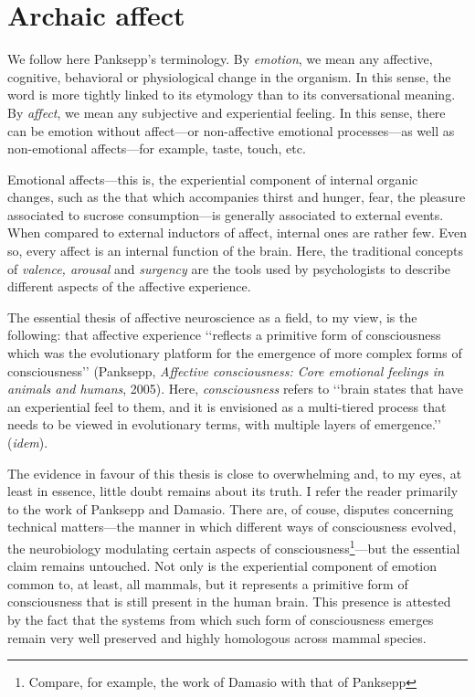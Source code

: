 \documentclass[a4paper]{article}
\begin{document}
    \section{Archaic affect}

    We follow here Panksepp's terminology. By \textit{emotion}, we mean any
    affective, cognitive, behavioral or physiological change in the organism. In
    this sense, the word is more tightly linked to its etymology than to its
    conversational meaning. By \textit{affect}, we mean any subjective and
    experiential feeling. In this sense, there can be emotion without
    affect---or non-affective emotional processes---as well as non-emotional
    affects---for example, taste, touch, etc.

    Emotional affects---this is, the experiential component of internal organic
    changes, such as the that which accompanies thirst and hunger, fear, the
    pleasure associated to sucrose consumption---is generally associated to
    external events. When compared to external inductors of affect, internal
    ones are rather few. Even so, every affect is an internal function of the
    brain. Here, the traditional concepts of \textit{valence, arousal} and
    \textit{surgency} are the tools used by psychologists to describe different
    aspects of the affective experience.

    The essential thesis of affective neuroscience as a field, to my view, is
    the following: that affective experience \lq\lq reflects a primitive form of
    consciousness which was the evolutionary platform for the emergence of more
    complex forms of consciousness\rq\rq{} (Panksepp, \textit{Affective consciousness:
    Core emotional feelings in animals and humans}, 2005). Here,
    \textit{consciousness} refers to \lq\lq brain states that have an
    experiential feel to them, and it is envisioned as a multi-tiered process
    that needs to be viewed in evolutionary terms, with multiple layers of
    emergence.\rq\rq{} (\textit{idem}).

    The evidence in favour of this thesis is close to overwhelming and, to my
    eyes, at least in essence, little doubt remains about its truth. I refer the
    reader primarily to the work of Panksepp and Damasio. There are, of couse,
    disputes concerning technical matters---the manner in which different ways
    of consciousness evolved, the neurobiology modulating certain aspects of
    consciousness\footnote{Compare, for example, the work of Damasio with that
    of Panksepp}---but the essential claim remains untouched. Not only is the
    experiential component of emotion common to, at least, all mammals, but it
    represents a primitive form of consciousness that is still present in the
    human brain. This presence is attested by the fact that the systems
    from which such form of consciousness emerges remain very well preserved
    and highly homologous across mammal species.
\end{document}
